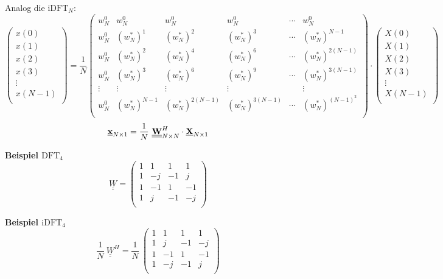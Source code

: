 \documentclass[10pt,a4paper]{article}
\newcommand{\fancyformula}[2]{
	\small\raggedright{\sffamily\textbf{#1}}
	#2
}
\begin{document}
\raggedright
Analog die $\mathrm{iDFT}_N$:
{\footnotesize
\[
	\begin{pmatrix}
		x(0)\\
		x(1)\\
		x(2)\\
		x(3)\\
		\vdots\\
		x(N-1)\\
	\end{pmatrix} = \frac{1}{N} \begin{pmatrix}
		w_{N}^0&w_{N}^0&w_{N}^0&w_{N}^0&\cdots&w_{N}^0\\
		w_{N}^0&(w^{*}_{N})^1&(w^{*}_{N})^2&(w_{N}^{*})^3&\cdots&(w_{N}^*)^{N-1}\\
		w_{N}^0&(w_{N}^{*})^2&(w^{*}_{N})^4&(w^{*}_{N})^6&\cdots&(w^{*}_{N})^{2(N-1)}\\
		w_{N}^0&(w^{*}_{N})^3&(w^{*}_{N})^6&(w^{*}_{N})^9&\cdots&(w^{*}_{N})^{3(N-1)}\\
		\vdots&\vdots&\vdots&\vdots&&\vdots\\
		w_{N}^{0}&(w_{N}^{*})^{N-1}&(w_{N}^{*})^{2(N-1)}&(w_{N}^{*})^{3(N-1)}&\cdots&(w_{N}^{*})^{(N-1)^2}\\
	\end{pmatrix} \cdot \begin{pmatrix}
		X(0)\\
		X(1)\\
		X(2)\\
		X(3)\\
		\vdots\\
		X(N-1)\\
	\end{pmatrix}
\]}
\[
	\underline{\textbf x}_{N \times 1} = \frac{1}{N} ~ \underline{\underline{\textbf W}}^H_{N \times N} \cdot \underline{\textbf X}_{N \times 1}
\]
\vspace{0.5em}
\begin{multicols}{2}
	\noindent
	\fancyformula{Beispiel $\mathrm{DFT}_4$}{\[
		\underline{\underline{W}}=
		\begin{pmatrix}
			1&1&1&1\\
			1&-j&-1&j\\
			1&-1&1&-1\\
			1&j&-1&-j\\
		\end{pmatrix}
	\]}

	\fancyformula{Beispiel $\mathrm{iDFT}_4$}{\[
		\frac{1}{N} ~ \underline{\underline{W}}^{H} = \frac{1}{N} ~
		\begin{pmatrix}
			1&1&1&1\\
			1&j&-1&-j\\
			1&-1&1&-1\\
			1&-j&-1&j\\
		\end{pmatrix}
	\]}
\end{multicols}
\end{document}
